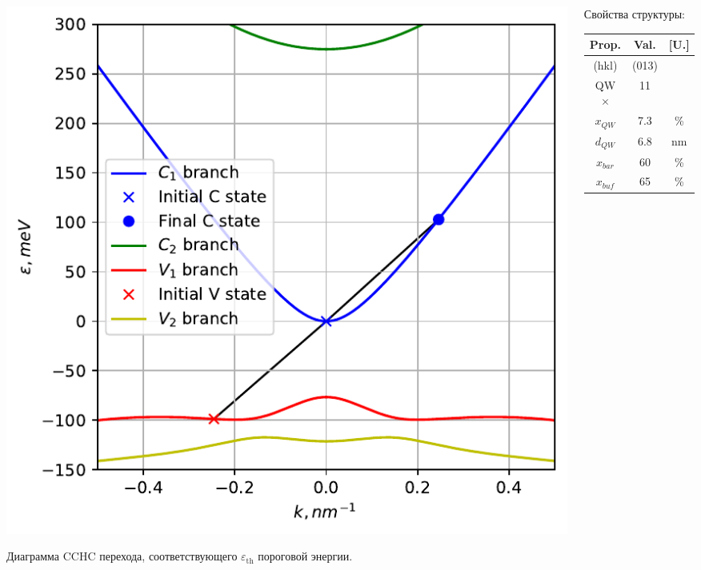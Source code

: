 \documentclass[9pt,pdf]{beamer}
\begin{document}
\begin{frame}
\begin{columns}
\begin{column}{0.7\textwidth}
\begin{overprint}
                    \begin{center}
                        \includegraphics[width=1\textwidth]{images/22um_spec.pdf}
                    \end{center}
                    Диаграмма CCHC перехода, соответствующего $\varepsilon_\text{th}$ 
                    пороговой энергии.
                \end{overprint}
            \end{column}
            \hfill
            \begin{column}{0.3\textwidth}
                Свойства структуры:
                \begin{center}
                    \begin{tabular}{c | c c}
                        Prop.   & Val.  & [U.]\\
                        \hline
                        (hkl)       &  (013)    &\\
                        QW $\times$ &   11      &\\
                        $x_{QW}$    & 7.3   & \%\\
                        $d_{QW}$    & 6.8  & nm\\
                        $x_{bar}$  & 60   & \%\\
                        $x_{buf}$  & 65   & \%\\

\end{tabular}
\end{center}
\end{column}
\end{columns}
\end{frame}
\end{document}
